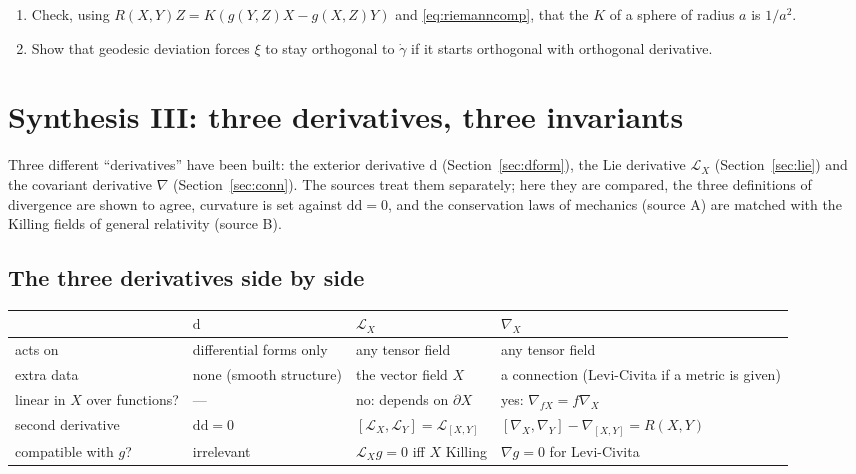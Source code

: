 \documentclass[11pt,a4paper]{article}
\renewcommand{\arraystretch}{1.25}
\numberwithin{equation}{section}
\theoremstyle{definition}
\theoremstyle{plain}
\newcommand{\dd}{\mathrm{d}}
\newcommand{\Lie}{\mathcal{L}}
\begin{document}
\begin{exercises}
\begin{enumerate}[nosep]
\item Check, using $R(X,Y)Z=K(g(Y,Z)X-g(X,Z)Y)$ and \eqref{eq:riemanncomp}, that the $K$ of a sphere of radius $a$ is $1/a^2$.
\item Show that geodesic deviation forces $\xi$ to stay orthogonal to $\dot\gamma$ if it starts orthogonal with orthogonal derivative.
\end{enumerate}
\end{exercises}


\section{Synthesis III: three derivatives, three invariants}\label{sec:synth3}

\begin{synthesis}
Three different ``derivatives'' have been built: the exterior derivative $\dd$ (Section~\ref{sec:dform}), the Lie derivative $\Lie_X$ (Section~\ref{sec:lie}) and the covariant derivative $\nabla$ (Section~\ref{sec:conn}). The sources treat them
separately; here they are compared, the three definitions of divergence are shown to agree, curvature is set against $\dd\dd=0$, and the conservation laws of mechanics (source A) are matched with the Killing fields of general relativity (source B).
\end{synthesis}

\subsection{The three derivatives side by side}\label{sec:threederivs}

\begin{center}
\small
\renewcommand{\arraystretch}{1.35}
\begin{tabular}{@{}p{2.3cm}p{3.5cm}p{3.7cm}p{4.4cm}@{}}
\toprule
 & $\dd$ & $\Lie_X$ & $\nabla_X$\\
\midrule
acts on & differential forms only & any tensor field & any tensor field\\
extra data & none (smooth structure) & the vector field $X$ & a connection (Levi-Civita if a metric is given)\\
linear in $X$ over functions? & --- & no: depends on $\partial X$ & yes: $\nabla_{fX}=f\nabla_X$\\
second derivative & $\dd\dd=0$ & $[\Lie_X,\Lie_Y]=\Lie_{[X,Y]}$ & $[\nabla_X,\nabla_Y]-\nabla_{[X,Y]}=R(X,Y)$ \\
compatible with $g$? & irrelevant & $\Lie_Xg=0$ iff $X$ Killing & $\nabla g=0$ for Levi-Civita\\
\bottomrule
\end{tabular}
\end{center}
\end{document}
